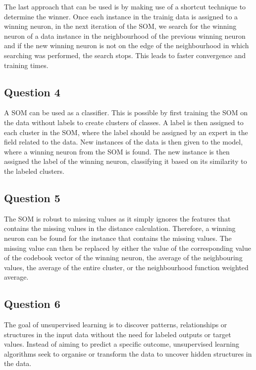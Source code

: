 \documentclass[10pt]{article}
\begin{document}
The last approach that can be used is by making use of a shortcut technique to determine the winner.
Once each instance in the trainig data is assigned to a winning neuron, in the next iteration
of the SOM, we search for the winning neuron of a data instance in the neighbourhood of the
previous winning neuron and if the new winning neuron is not on the edge of the neighbourhood in
which searching was performed, the search stops. This leads to faster convergence and training times.

\subsection*{Question 4}

A SOM can be used as a classifier. This is possible by first training the SOM on the data without
labels to create clusters of classes. A label is then assigned to each cluster in the SOM, where the label
should be assigned by an expert in the field related to the data. New instances of the data is then given
to the model, where a winning neuron from the SOM is found. The new instance is then assigned the label
of the winning neuron, classifying it based on its similarity to the labeled clusters.

\subsection*{Question 5}

The SOM is robust to missing values as it simply ignores the features that contains the missing values
in the distance calculation. Therefore, a winning neuron can be found for the instance that contains
the missing values. The missing value can then be replaced by either the value of the corresponding
value of the codebook vector of the winning neuron, the average of the neighbouring values, the average
of the entire cluster, or the neighbourhood function weighted average.

\subsection*{Question 6}

The goal of unsupervised learning is to discover patterns, relationships or structures in the input data
without the need for labeled outputs or target values. Instead of aiming to predict a specific outcome,
unsupervised learning algorithms seek to organise or transform the data to uncover hidden structures
in the data.
\end{document}
